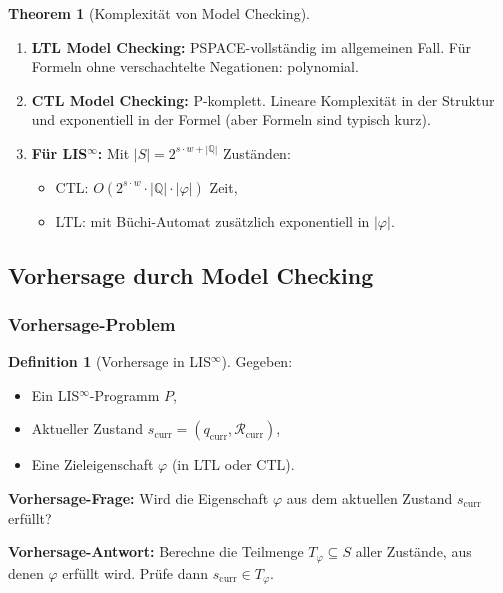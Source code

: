 \documentclass[a4paper,12pt]{article}
\theoremstyle{definition}
\newtheorem{theorem}{Theorem}
\newtheorem{definition}{Definition}
\begin{document}
\begin{theorem}[Komplexität von Model Checking]
	\label{thm:complexity_model_checking}
	\begin{enumerate}
		\item \textbf{LTL Model Checking:} PSPACE-vollständig im allgemeinen Fall. Für Formeln ohne verschachtelte Negationen: polynomial.
		\item \textbf{CTL Model Checking:} P-komplett. Lineare Komplexität in der Struktur und exponentiell in der Formel (aber Formeln sind typisch kurz).
		\item \textbf{Für LIS$^{\infty}$:} Mit $|S| = 2^{s \cdot w + |\mathbb{Q}|}$ Zuständen:
		\begin{itemize}
			\item CTL: $O(2^{s \cdot w} \cdot |\mathbb{Q}| \cdot |\varphi|)$ Zeit,
			\item LTL: mit Büchi-Automat zusätzlich exponentiell in $|\varphi|$.
		\end{itemize}
	\end{enumerate}
\end{theorem}

\subsection{Vorhersage durch Model Checking}

\subsubsection{Vorhersage-Problem}

\begin{definition}[Vorhersage in LIS$^{\infty}$]
	\label{def:vorhersage}
	Gegeben:
	\begin{itemize}
		\item Ein LIS$^{\infty}$-Programm $P$,
		\item Aktueller Zustand $s_{\text{curr}} = (q_{\text{curr}}, \mathcal{R}_{\text{curr}})$,
		\item Eine Zieleigenschaft $\varphi$ (in LTL oder CTL).
	\end{itemize}
	
	\textbf{Vorhersage-Frage:} Wird die Eigenschaft $\varphi$ aus dem aktuellen Zustand $s_{\text{curr}}$ erfüllt?
	
	\textbf{Vorhersage-Antwort:} Berechne die Teilmenge $T_{\varphi} \subseteq S$ aller Zustände, aus denen $\varphi$ erfüllt wird. Prüfe dann $s_{\text{curr}} \in T_{\varphi}$.
\end{definition}
\end{document}
